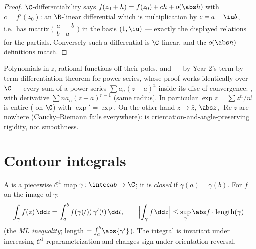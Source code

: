 \begin{proof}
$\C$-differentiability says $f(z_0 + h) = f(z_0) + ch +
o(\abs h)$ with $c = f'(z_0)$: an $\R$-linear differential
which is multiplication by $c = a + \iu b$, i.e.\ has matrix
$\bigl(\begin{smallmatrix} a & -b\\ b & a
\end{smallmatrix}\bigr)$ in the basis $(1, \iu)$ --- exactly
the displayed relations for the partials. Conversely such a
differential is $\C$-linear, and the $o(\abs h)$ definitions
match.
\end{proof}

\begin{example}\label{ex:b3:holomorphic:examples}
Polynomials in $z$, rational functions off their poles, and
--- by Year 2's term-by-term differentiation theorem for power
series, whose proof works identically over $\C$ --- every sum
of a power series $\sum a_n(z - a)^n$ inside its disc of
convergence: , with derivative $\sum na_n(z -
a)^{n-1}$ (same radius). In particular $\exp z = \sum z^n/n!$
is entire ( on $\C$) with $\exp' = \exp$. On the
other hand $z \mapsto \bar z$, $\abs z$, $\operatorname{Re}z$
are nowhere  (Cauchy--Riemann fails everywhere):
 is orientation-and-angle-preserving rigidity, not
smoothness.
\end{example}

\section{Contour integrals}

\begin{definition}\label{def:b3:holomorphic:contour}
A \emph{} is a piecewise $\mathcal C^1$ map $\gamma \colon
\intcc ab \to \C$; it is \emph{closed} if $\gamma(a) =
\gamma(b)$. For  $f$ on the image of
$\gamma$:
\[
\int_\gamma f(z)\,\dd z =
\int_a^b f(\gamma(t))\,\gamma'(t)\,\dd t,
\qquad
\Bigl|\int_\gamma f\,\dd z\Bigr| \leq
\sup_{\gamma}\abs f\cdot\operatorname{length}(\gamma)
\]
(the \emph{ML inequality}; length $= \int_a^b\abs{\gamma'}$).
The integral is invariant under increasing $\mathcal C^1$
reparametrization and changes sign under orientation reversal.
\end{definition}

